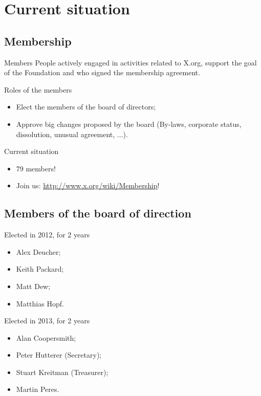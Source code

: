 \documentclass{beamer}
\begin{document}
	\section{Current situation}
		\subsection{Membership}
		\begin{frame}
			\begin{block}{Members}
				People actively engaged in activities related to X.org, 
support the goal of the Foundation and who signed the membership agreement.
			\end{block}

			\begin{block}{Roles of the members}
				\begin{itemize}
					\item Elect the members of the board of
directors;
					\item Approve big changes proposed by the 
board (By-laws, corporate status, dissolution, unusual agreement, ...).
				\end{itemize}
			\end{block}

			\begin{block}{Current situation}
				\begin{itemize}
					\item 79 members!
					\item Join us:
\url{http://www.x.org/wiki/Membership}!
				\end{itemize}
			\end{block}
		\end{frame}

		\subsection{Members of the board of direction}
		\begin{frame}
			\begin{block}{Elected in 2012, for 2 years}
				\begin{itemize}
					\item Alex Deucher;
					\item Keith Packard;
					\item Matt Dew;
					\item Matthias Hopf.
				\end{itemize}
			\end{block}

			\begin{block}{Elected in 2013, for 2 years}
				\begin{itemize}
					\item Alan Coopersmith;
					\item Peter Hutterer (Secretary);
					\item Stuart Kreitman (Treasurer);
					\item Martin Peres.
				\end{itemize}
			\end{block}
		\end{frame}
\end{document}
